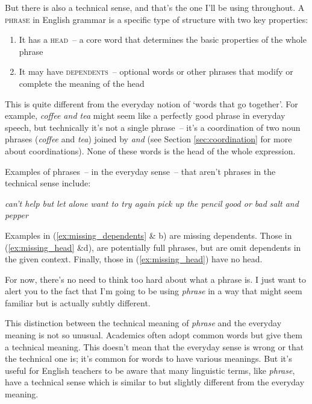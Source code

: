 But there is also a technical sense, and that's the one I'll be using throughout. A \textsc{phrase} in English grammar is a specific type of structure with two key properties:
\begin{enumerate}[noitemsep]
    \item It has a \textsc{head}~-- a core word that determines the basic properties of the whole phrase
    \item It may have \textsc{dependents}~-- optional words or other phrases that modify or complete the meaning of the head
\end{enumerate}
This is quite different from the everyday notion of `words that go together'. For example, \textit{coffee and tea} might seem like a perfectly good phrase in everyday speech, but technically it's not a single phrase~-- it's a coordination of two noun phrases (\textit{coffee} and \textit{tea}) joined by \textit{and} (see Section \ref{sec:coordination} for more about coordinations). None of these words is the head of the whole expression.

Examples of phrases~-- in the everyday sense~-- that aren't phrases in the technical sense include:

\setlength{\columnsep}{0pt}
\begin{multicols}{2}
\ea
    \ea \label{ex:missing_dependents} \textit{can't help but}
    \ex \textit{let alone}
    \ex \label{ex:missing_dep_context} \textit{{\ob}want to{\cb} try again}
    \ex \textit{{\ob}pick up{\cb} the pencil}
    \ex \textit{good or bad}\label{ex:missing_head}
    \ex  \textit{salt and pepper}
\z
\z
\end{multicols}
Examples in (\ref{ex:missing_dependents} \& b) are missing dependents. Those in (\ref{ex:missing_head} \&d), are potentially full phrases, but are omit dependents in the given context. Finally, those in (\ref{ex:missing_head}) have no head.

For now, there's no need to think too hard about what a phrase is. I just want to alert you to the fact that I'm going to be using \textit{phrase} in a way that might seem familiar but is actually subtly different.

This distinction between the technical meaning of \textit{phrase} and the everyday meaning is not so unusual. Academics often adopt common words but give them a technical meaning. This doesn't mean that the everyday sense is wrong or that the technical one is; it's common for words to have various meanings. But it's useful for English teachers to be aware that many linguistic terms, like \textit{phrase}, have a technical sense which is similar to but slightly different from the everyday meaning.

